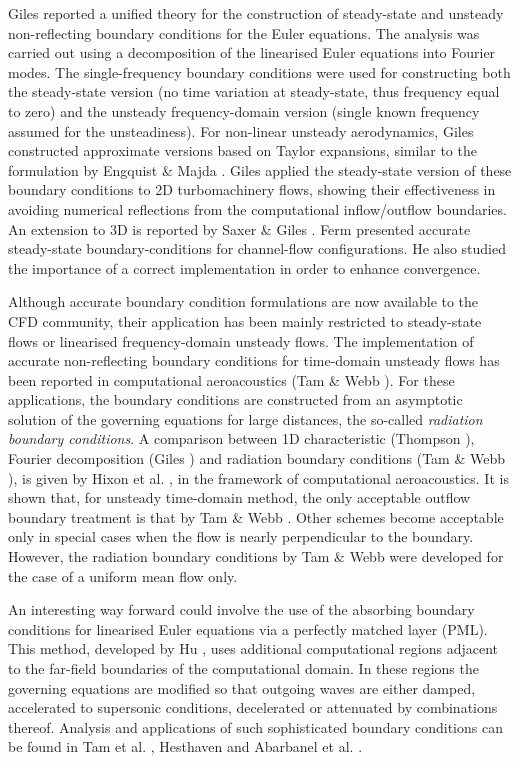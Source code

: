  Giles \citeyear{Giles:5,Giles:6} reported a unified theory for
 the construction of steady-state and unsteady non-reflecting
 boundary conditions for the Euler equations. The analysis
 was carried out using a decomposition of the linearised Euler equations
 into Fourier modes.
 The single-frequency boundary conditions were used for
 constructing both the steady-state version (no time
 variation at steady-state, thus frequency equal to zero)
 and the unsteady frequency-domain version (single known frequency
 assumed for the unsteadiness).
 For non-linear unsteady aerodynamics, Giles constructed approximate versions
 based on Taylor expansions, similar to the formulation by
 Engquist \& Majda \citeyear{Engquist:1}.
 Giles \citeyear{Giles:6} applied the steady-state version of these boundary
 conditions to 2D turbomachinery flows, showing their effectiveness in
 avoiding numerical reflections from the computational inflow/outflow
 boundaries.
 An extension to 3D is reported by Saxer \& Giles \citeyear{Giles:7}.
 Ferm \citeyear{Ferm:1} presented accurate steady-state boundary-conditions
 for channel-flow configurations. He also studied the importance
 of a correct implementation in order to enhance convergence.

 Although accurate boundary condition formulations are now available
 to the CFD community, their application has been mainly restricted
 to steady-state flows or linearised frequency-domain unsteady flows.
 The implementation of accurate non-reflecting boundary conditions
 for time-domain unsteady flows has been reported in
 computational aeroacoustics (Tam \& Webb ).
 For these applications, the boundary conditions are constructed from
 an asymptotic solution of the governing equations for large
 distances, the so-called {\em radiation boundary conditions}.
 A comparison between 1D characteristic
 (Thompson ), Fourier
 decomposition (Giles ) and
 radiation boundary conditions (Tam \& Webb ),
 is given by Hixon et al. \citeyear{Hixon:1},
 in the framework of computational aeroacoustics.
 It is shown that, for unsteady time-domain 
 method, the only acceptable outflow boundary treatment is that by 
 Tam \& Webb \citeyear{Tam:1}. Other schemes become
 acceptable only in special cases when the flow is nearly
 perpendicular to the boundary.
 However, the radiation boundary conditions by Tam \& Webb \citeyear{Tam:1}
 were developed for the case of a uniform mean flow only.

 An interesting way forward could involve the use of
 the absorbing boundary conditions for linearised Euler equations
 via a perfectly matched layer (PML). This method, developed by
 Hu \citeyear{Hu:1}, uses additional computational regions adjacent to the
 far-field boundaries of the computational domain. In these regions
 the governing equations are modified so that outgoing waves are
 either damped, accelerated to supersonic conditions, decelerated
 or attenuated by combinations thereof.
 Analysis and applications of such sophisticated boundary conditions
 can be found in Tam et al. \citeyear{Tam:1}, Hesthaven \citeyear{Hesthaven:1}
 and Abarbanel et al. \citeyear{Hesthaven:2}.
